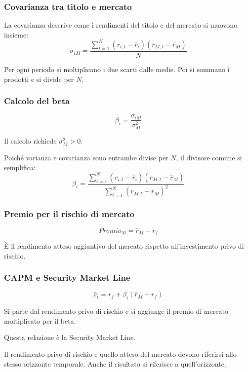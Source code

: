 \subsubsection*{Covarianza tra titolo e mercato}

\noindent
La covarianza descrive come i rendimenti del titolo
e del mercato si muovono insieme:
\[
    \sigma_{iM}
    =
    \frac{
        \sum_{t=1}^{N}
        (r_{i,t}-\overline r_i)
        (r_{M,t}-\overline r_M)
    }{N}
\]

\noindent
Per ogni periodo si moltiplicano i due scarti dalle medie.
Poi si sommano i prodotti e si divide per $N$.

\subsubsection*{Calcolo del beta}

\[
    \beta_i=\frac{\sigma_{iM}}{\sigma_M^2}
\]

\noindent
Il calcolo richiede $\sigma_M^2>0$.

\noindent
Poiché varianza e covarianza sono entrambe divise per $N$,
il divisore comune si semplifica:
\[
    \beta_i
    =
    \frac{
        \sum_{t=1}^{N}
        (r_{i,t}-\overline r_i)
        (r_{M,t}-\overline r_M)
    }{
        \sum_{t=1}^{N}(r_{M,t}-\overline r_M)^2
    }
\]

\subsubsection*{Premio per il rischio di mercato}

\[
    Premio_M=\widehat r_M-r_f
\]

\noindent
È il rendimento atteso aggiuntivo del mercato
rispetto all'investimento privo di rischio.

\subsubsection*{CAPM e Security Market Line}

\[
    \widehat r_i
    =
    r_f+\beta_i(\widehat r_M-r_f)
\]

\noindent
Si parte dal rendimento privo di rischio e si aggiunge
il premio di mercato moltiplicato per il beta.

\noindent
Questa relazione è la Security Market Line.

\noindent
Il rendimento privo di rischio e quello atteso del mercato
devono riferirsi allo stesso orizzonte temporale.
Anche il risultato si riferisce a quell'orizzonte.

